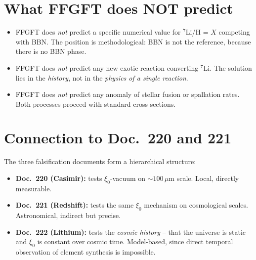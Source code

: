 \section{What FFGFT does NOT predict}

\begin{itemize}[leftmargin=2em,itemsep=2pt,topsep=2pt]
  \item FFGFT does \emph{not} predict a specific numerical value for
        $^7$Li/H = $X$ competing with BBN. The position is
        methodological: BBN is not the reference, because there is
        no BBN phase.
  \item FFGFT does \emph{not} predict any new exotic reaction
        converting $^7$Li. The solution lies in the \emph{history},
        not in the \emph{physics of a single reaction}.
  \item FFGFT does \emph{not} predict any anomaly of stellar fusion
        or spallation rates. Both processes proceed with standard
        cross sections.
\end{itemize}

\section{Connection to Doc.~220 and 221}

The three falsification documents form a hierarchical structure:

\begin{itemize}[leftmargin=2em,itemsep=2pt,topsep=2pt]
  \item \textbf{Doc.~220 (Casimir):} tests $\xi_0$-vacuum on
        $\sim 100\,\mu$m scale. Local, directly measurable.
  \item \textbf{Doc.~221 (Redshift):} tests the same $\xi_0$
        mechanism on cosmological scales. Astronomical, indirect
        but precise.
  \item \textbf{Doc.~222 (Lithium):} tests the \emph{cosmic history}
        -- that the universe is static and $\xi_0$ is constant over
        cosmic time. Model-based, since direct temporal observation
        of element synthesis is impossible.
\end{itemize}

